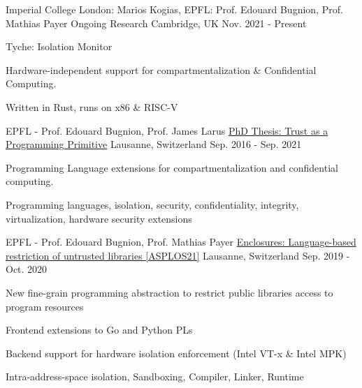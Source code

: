 \begin{cventries}

\cventry
{Imperial College London: Marios Kogias, EPFL: Prof. Edouard Bugnion, Prof. Mathias Payer}
{Ongoing Research}
{Cambridge, UK}
{Nov. 2021 - Present}
{ %
	\begin{cvitems}
  \item{Tyche: Isolation Monitor}
  \item{Hardware-independent support for compartmentalization \& Confidential Computing.}
  \item{Written in Rust, runs on x86 \& RISC-V}
	\end{cvitems}
}



\cventry
{EPFL - Prof. Edouard Bugnion, Prof. James Larus}
  {\href{https://infoscience.epfl.ch/record/289120}{PhD Thesis: Trust as a Programming Primitive}}
{Lausanne, Switzerland}
{Sep. 2016  - Sep. 2021}
{
	\begin{cvitems}
  \item{Programming Language extensions for compartmentalization and confidential computing.}
  \item{Programming languages, isolation, security, confidentiality, integrity, virtualization, hardware security extensions}
	\end{cvitems}
}


\cventry
{EPFL - Prof. Edouard Bugnion, Prof. Mathias Payer}
  {\href{https://hexhive.epfl.ch/publications/files/21ASPLOS.pdf}{Enclosures: Language-based restriction of untrusted libraries [ASPLOS21]}}
{Lausanne, Switzerland}
{Sep. 2019  - Oct. 2020}
{
	\begin{cvitems}
  \item{New fine-grain programming abstraction to restrict public libraries access to program resources}
  \item{Frontend extensions to Go and Python PLs}
  \item{Backend support for hardware isolation enforcement (Intel VT-x \& Intel MPK)}
  \item{Intra-address-space isolation, Sandboxing, Compiler, Linker, Runtime}
	\end{cvitems}
}


\end{cventries}
